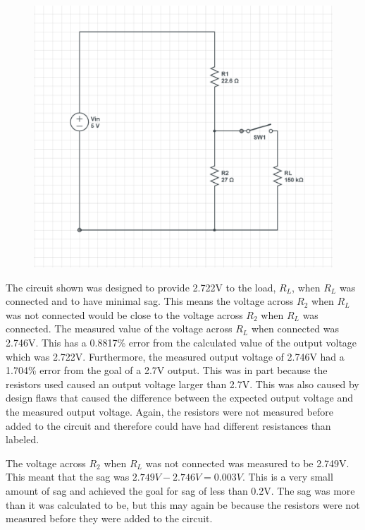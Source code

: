 \documentclass[twocolumn, amsmath]{revtex4}
\begin{document}
\begin{figure}[h]  
\includegraphics[scale = 0.35]{diagram2lab1.eps}  
\graphicspath{ {/home/evin/Desktop/School/Circuits/lab1/} }
\end{figure}

The circuit shown was designed to provide 2.722V to the load, $R_L$, when $R_L$ was connected and to have minimal sag. This means the voltage across $R_2$ when $R_L$ was not connected would be close to the voltage across $R_2$ when $R_L$ was connected. The measured value of the voltage across $R_L$ when connected was 2.746V. This has a 0.8817\% error from the calculated value of the output voltage which was 2.722V. Furthermore, the measured output voltage of 2.746V had a 1.704\% error from the goal of a 2.7V output. This was in part because the resistors used caused an output voltage larger than 2.7V. This was also caused by design flaws that caused the difference between the expected output voltage and the measured output voltage. Again, the resistors were not measured before added to the circuit and therefore could have had different resistances than labeled. 

The voltage across $R_2$ when $R_L$ was not connected was measured to be 2.749V. This meant that the sag was  $2.749V - 2.746V = 0.003V$. This is a very small amount of sag and achieved the goal for sag of less than 0.2V. The sag was more than it was calculated to be, but this may again be because the resistors were not measured before they were added to the circuit.
\end{document}
